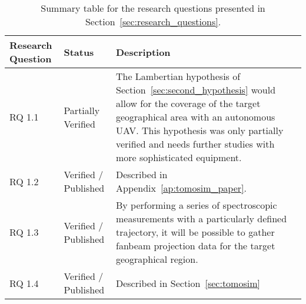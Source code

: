 \begin{table}[htb]
    \centering
    \caption{Summary table for the research questions presented in
    Section~\ref{sec:research_questions}.}
    \begin{tabularx}{\textwidth}{l l X}
        \toprule
        Research Question & Status  & Description\\
        \midrule

        RQ 1.1 & \cellcolor[HTML]{FFEB9C}\color[HTML]{AA6A17}Partially
        Verified& \cellcolor[HTML]{FFEB9C}\color[HTML]{AA6A17}The
        Lambertian hypothesis of Section~\ref{sec:second_hypothesis}
        would allow for the coverage of the target geographical area
        with an autonomous \gls{UAV}.  This hypothesis was only
        partially verified and needs further studies with more
        sophisticated equipment. \\

        \midrule

        RQ 1.2 & \cellcolor[HTML]{C6EFCD}\color[HTML]{367E33}Verified /
        Published &\cellcolor[HTML]{C6EFCD}\color[HTML]{367E33}Described in
        Appendix~\ref{ap:tomosim_paper}. \\

        \midrule

        RQ 1.3 & \cellcolor[HTML]{C6EFCD}\color[HTML]{367E33}Verified /
        Published &\cellcolor[HTML]{C6EFCD}\color[HTML]{367E33}By performing a
        series of spectroscopic measurements with a particularly defined
        trajectory, it will be possible to gather fanbeam projection
        data for the target geographical region. \\

        \midrule

        RQ 1.4 & \cellcolor[HTML]{C6EFCD}\color[HTML]{367E33}Verified /
        Published &\cellcolor[HTML]{C6EFCD}\color[HTML]{367E33}Described in
        Section~\ref{sec:tomosim}\\

        \bottomrule
        
    \end{tabularx}
\end{table}
